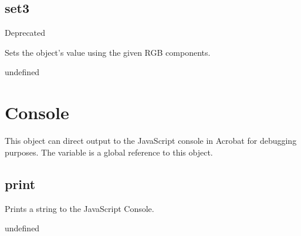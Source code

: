 \documentclass[letterpaper,12pt,english,openany,oneside]{sphinxmanual}
\begin{document}
\subsection{set3}
\label{\detokenize{JS_3D_API:set3}}
Deprecated

Sets the  object’s value using the given RGB components.

\label{\detokenize{JS_3D_API:syntax-15}}

\begin{sphinxVerbatim}[commandchars=\\\{\}]
  
\end{sphinxVerbatim}
\label{\detokenize{JS_3D_API:parameters-9}}

\label{\detokenize{JS_3D_API:section-17}}\label{\detokenize{JS_3D_API:returns-15}}

undefined


\section{Console}
\label{\detokenize{JS_3D_API:console}}
This object can direct output to the JavaScript console in Acrobat for debugging purposes. The variable  is a global reference to this object.


\subsection{print}
\label{\detokenize{JS_3D_API:print}}
Prints a string to the JavaScript Console.

\label{\detokenize{JS_3D_API:syntax-16}}

\begin{sphinxVerbatim}[commandchars=\\\{\}]
\end{sphinxVerbatim}
\label{\detokenize{JS_3D_API:parameters-10}}

\label{\detokenize{JS_3D_API:section-18}}\label{\detokenize{JS_3D_API:returns-16}}

undefined
\end{document}
